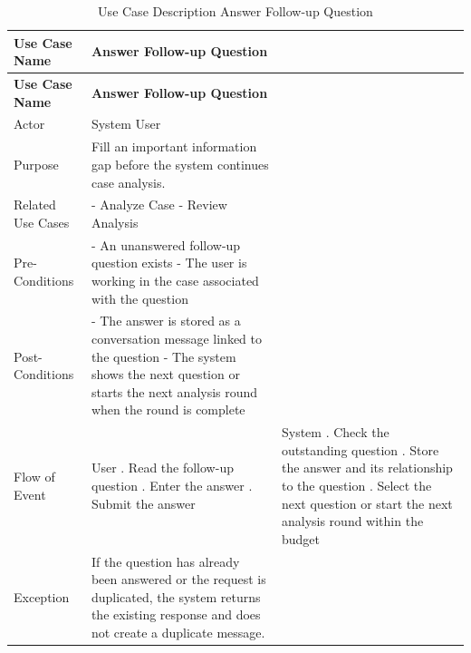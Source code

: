 \begin{longtable}{@{}>{\raggedright\arraybackslash}p{} >{\raggedright\arraybackslash}p{} >{\raggedright\arraybackslash}p{}@{}}
\caption{Use Case Description Answer Follow-up Question}\label{tab:3-5}\\
\toprule
\textbf{Use Case Name} & \textbf{Answer Follow-up Question} & \textbf{} \\
\midrule
\endfirsthead
\textbf{Use Case Name} & \textbf{Answer Follow-up Question} & \textbf{} \\
\midrule
\endhead
Actor & System User &  \\
Purpose & Fill an important information gap before the system continues case analysis. &  \\
Related Use Cases & - Analyze Case \newline - Review Analysis &  \\
Pre-Conditions & - An unanswered follow-up question exists \newline - The user is working in the case associated with the question &  \\
Post-Conditions & - The answer is stored as a conversation message linked to the question \newline - The system shows the next question or starts the next analysis round when the round is complete &  \\
Flow of Event & User \newline 1. Read the follow-up question \newline 2. Enter the answer \newline 3. Submit the answer & System \newline 1. Check the outstanding question \newline 2. Store the answer and its relationship to the question \newline 3. Select the next question or start the next analysis round within the budget \\
Exception & If the question has already been answered or the request is duplicated, the system returns the existing response and does not create a duplicate message. &  \\
\bottomrule
\end{longtable}

